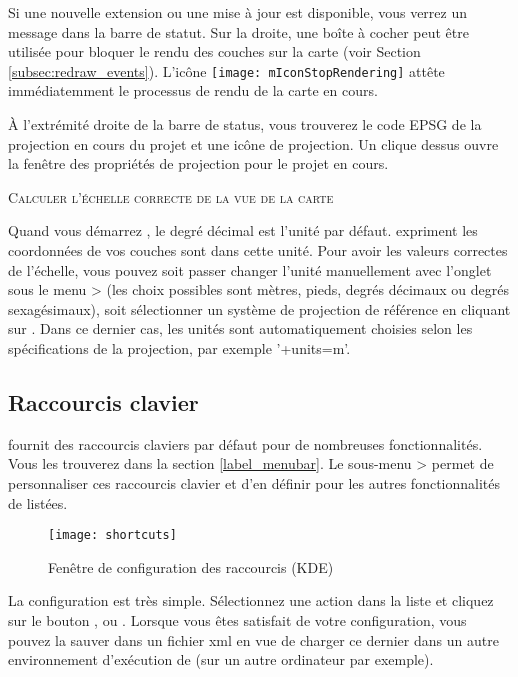 Si une nouvelle extension ou une mise à jour est disponible, vous verrez un message 
dans la barre de statut. Sur la droite, une boîte à cocher peut être utilisée 
pour bloquer le rendu des couches sur la carte (voir Section \ref{subsec:redraw_events}). 
L'icône \texttt{[image: mIconStopRendering]} attête immédiatemment le processus 
de rendu de la carte en cours.

À l'extrémité droite de la barre de status, vous trouverez le code EPSG de la projection en 
cours du projet et une icône de projection. Un clique dessus ouvre la fenêtre des 
propriétés de projection pour le projet en cours.

\begin{Tip} \caption{\textsc{Calculer l'échelle correcte de la vue de la carte}} 
Quand vous démarrez \qg, le degré décimal est l'unité par défaut. \qg expriment 
les coordonnées de vos couches sont dans cette unité. Pour avoir les valeurs 
correctes de l'échelle, vous pouvez soit passer changer l'unité manuellement 
avec l'onglet  sous le menu  > 
(les choix possibles sont mètres, pieds, degrés décimaux ou degrés sexagésimaux), 
soit sélectionner un système de projection de référence en cliquant sur 
. Dans ce 
dernier cas, les unités sont automatiquement choisies selon les spécifications 
de la projection, par exemple '+units=m'.
\end{Tip}

\subsection{Raccourcis clavier} \label{shortcuts}

\qg fournit des raccourcis claviers par défaut pour de nombreuses fonctionnalités. Vous les trouverez dans la section \ref{label_menubar}. Le sous-menu  >  permet de personnaliser ces raccourcis clavier et d'en définir pour les autres fonctionnalités de \qg listées.  

\begin{figure}[ht]
   \centering
   \texttt{[image: shortcuts]}
   \caption{Fenêtre de configuration des raccourcis \nixcaption (KDE)} \label{fig:shortcuts}
\end{figure}

La configuration est très simple. Sélectionnez une action dans la liste et cliquez sur le bouton ,  ou . Lorsque vous êtes satisfait de votre configuration, vous pouvez la sauver dans un fichier xml en vue de  charger ce dernier dans un autre environnement d'exécution de \qg (sur un autre ordinateur par exemple). 

